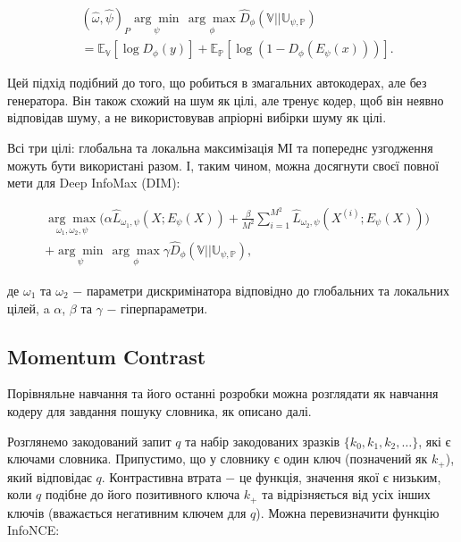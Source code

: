 \begin{equation}\label{eq:div}
\begin{aligned}
&(\hat{\omega}, \hat{\psi})_{P} \underset{\psi}{\arg\min}\,\underset{\phi}{\arg\max}\hat{D}_{\phi}(\mathbb{V}||\mathbb{U_{\psi,P}}) \\
&= \mathbb{E_{V}}[\log{D_{\phi}(y)}] + \mathbb{E_{P}}[\log{(1-D_{\phi}(E_{\psi}(x)))}].
\end{aligned}
\end{equation}

\vspace{1.5em}

Цей підхід подібний до того, що робиться в змагальних автокодерах, але без генератора. Він також схожий на шум як цілі, але тренує кодер, щоб він неявно відповідав шуму, а не використовував апріорні вибірки шуму як цілі.

Всі три цілі: глобальна та локальна максимізація МІ та попереднє узгодження можуть бути використані разом. І, таким чином, можна досягнути своєї повної мети для Deep InfoMax (DIM):

\begin{equation}\label{eq:deepinfomax}
\begin{aligned}
&\underset{\omega_{1},\omega_{2},\psi}{\arg\max}(\alpha \hat{L}_{\omega_{1},\psi}(X; E_{\psi}(X)) + \frac{\beta}{M^{2}}\sum_{i=1}^{M^{2}}{\hat{L}_{\omega_{2}, \psi}(X^{(i)}; E_{\psi}(X)))} \\
&+ \underset{\psi}{\arg\min}\,\underset{\phi}{\arg\max}\gamma\hat{D}_{\phi}(\mathbb{V}||\mathbb{U_{\psi,P}}),
\end{aligned}
\end{equation}

\noindent де $\omega_{1}$ та $\omega_{2}$ $-$ параметри дискримінатора відповідно до глобальних та локальних цілей, a $\alpha$, $\beta$ та $\gamma$ $-$ гіперпараметри.

\vspace{1.5em}

\subsection{Momentum Contrast}

Порівняльне навчання та його останні розробки можна розглядати як навчання кодеру для завдання пошуку словника, як описано далі.

Розглянемо закодований запит $q$ та набір закодованих зразків $\{k_{0}, k_{1}, k_{2}, \dots\}$, які є ключами словника. Припустимо, що у словнику є один ключ (позначений як $k_{+}$), який відповідає $q$. Контрастивна втрата $-$ це функція, значення якої є низьким, коли $q$ подібне до його позитивного ключа $k_{+}$ та відрізняється від усіх інших ключів (вважається негативним ключем для $q$). Можна перевизначити функцію InfoNCE:

